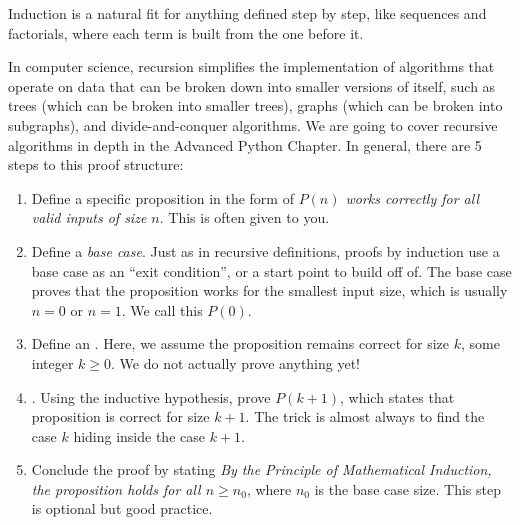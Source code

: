 Induction is a natural fit for anything defined step by step, like sequences and factorials, where each term is built from the one before it.

In computer science, recursion simplifies the implementation of algorithms that operate on data that can be broken down into smaller versions of itself, such as trees (which can be broken into smaller trees), graphs (which can be broken into subgraphs), and divide-and-conquer algorithms. We are going to cover recursive algorithms in depth in the Advanced Python Chapter.
In general, there are 5 steps to this proof structure:
\begin{enumerate}
    \item Define a specific proposition in the form of \textit{$P(n)$ works correctly for all valid inputs of size $n$}. This is often given to you.
    \item Define a \textit{base case}. Just as in recursive definitions, proofs by induction use a base case as an ``exit condition'', or a start point to build off of. The base case proves that the proposition works for the smallest input size, which is usually $n=0$ or $n=1$. We call this $P(0)$.
    \item Define an . Here, we assume the proposition remains correct for size $k$, some integer $k\ge 0$. We do not actually prove anything yet!
    \item {}. Using the inductive hypothesis, prove $P(k+1)$, which states that proposition is correct for size $k+1$. The trick is almost always to find the case $k$ hiding inside the case $k+1$.
    \item Conclude the proof by stating \textit{By the Principle of Mathematical Induction, the proposition holds for all $n \ge n_0$}, where $n_0$ is the base case size. This step is optional but good practice.
\end{enumerate}

